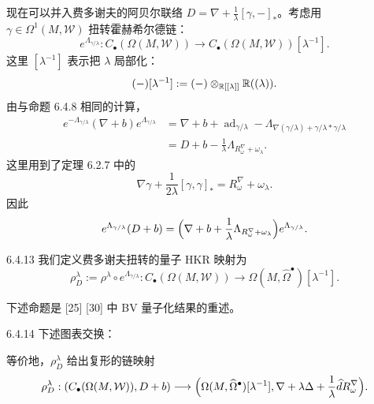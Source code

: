 现在可以并入费多谢夫的阿贝尔联络 $D=\nabla+\frac1\lambda[\gamma,-]_\ast$。考虑用 $\gamma\in\Omega^1(M,\mathcal W)$ 扭转霍赫希尔德链：
\[
e^{\Lambda_{\gamma/\lambda}}:C_\bullet(\Omega(M,\mathcal W))
\longrightarrow C_\bullet(\Omega(M,\mathcal W))[\lambda^{-1}].
\]
这里 $[\lambda^{-1}]$ 表示把 $\lambda$ 局部化：
\[
(-)[\lambda^{-1}]:=(-)\otimes_{\mathbb{R}[[\lambda]]}\mathbb{R}((\lambda)).
\]
由与命题 6.4.8 相同的计算，
\begin{align*}
e^{-\Lambda_{\gamma/\lambda}}(\nabla+b)e^{\Lambda_{\gamma/\lambda}}
&=\nabla+b+\operatorname{ad}_{\gamma/\lambda}
-\Lambda_{\nabla(\gamma/\lambda)+\gamma/\lambda\ast\gamma/\lambda}\\
&=D+b-\frac1\lambda\Lambda_{R_\omega^\nabla+\omega_\lambda}.
\end{align*}
这里用到了定理 6.2.7 中的
\[
\nabla\gamma+\frac{1}{2\lambda}[\gamma,\gamma]_\ast
=R_\omega^\nabla+\omega_\lambda.
\]
因此
\[
e^{\Lambda_{\gamma/\lambda}}(D+b)
=\Bigl(\nabla+b+\frac1\lambda\Lambda_{R_\omega^\nabla+\omega_\lambda}\Bigr)
e^{\Lambda_{\gamma/\lambda}}.
\]

\begin{definition}{6.4.13}
  我们定义费多谢夫扭转的量子 HKR 映射为
  \[
  \rho_D^\lambda:=\rho^\lambda\circ e^{\Lambda_{\gamma/\lambda}}:
  C_\bullet(\Omega(M,\mathcal W))
  \longrightarrow\Omega(M,\widehat\Omega^\bullet)[\lambda^{-1}].
  \]
\end{definition}

下述命题是 [25] [30] 中 BV 量子化结果的重述。

\begin{proposition}{6.4.14}
  下述图表交换：
  \begin{center}
  \end{center}
  等价地，$\rho_D^\lambda$ 给出复形的链映射
  \[
  \rho_D^\lambda:(C_\bullet(\Omega(M,\mathcal W)),D+b)
  \longrightarrow\Bigl(\Omega(M,\widehat\Omega^\bullet)[\lambda^{-1}],
  \nabla+\lambda\Delta+\frac1\lambda\widehat dR_\omega^\nabla\Bigr).
  \]
\end{proposition}

